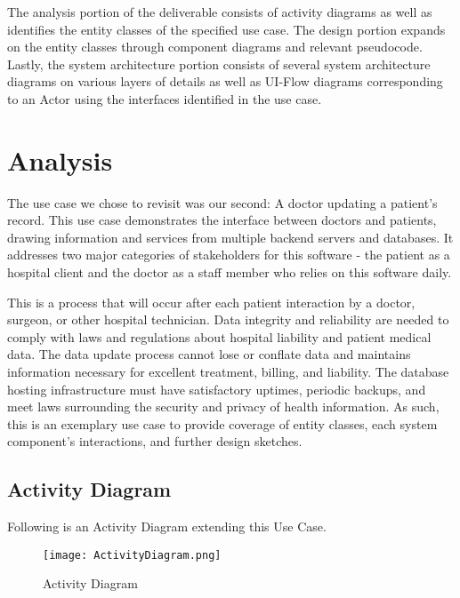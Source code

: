 \documentclass[a4paper, 11pt]{article}
\begin{document}
The analysis portion of the deliverable consists of activity diagrams as well as identifies the entity classes of the specified use case. The design portion expands on the entity classes through component diagrams and relevant pseudocode. Lastly, the system architecture portion consists of several system architecture diagrams on various layers of details as well as UI-Flow diagrams corresponding to an Actor using the interfaces identified in the use case.

\section{Analysis}

The use case we chose to revisit was our second: A doctor updating a patient's record. This use case demonstrates the interface between doctors and patients, drawing information and services from multiple backend servers and databases. It addresses two major categories of stakeholders for this software - the patient as a hospital client and the doctor as a staff member who relies on this software daily.

This is a process that will occur after each patient interaction by a doctor, surgeon, or other hospital technician. Data integrity and reliability are needed to comply with laws and regulations about hospital liability and patient medical data. The data update process cannot lose or conflate data and maintains information necessary for excellent treatment, billing, and liability. The database hosting infrastructure must have satisfactory uptimes, periodic backups, and meet laws surrounding the security and privacy of health information. As such, this is an exemplary use case to provide coverage of entity classes, each system component's interactions, and further design sketches. 

\subsection{Activity Diagram}

Following is an Activity Diagram extending this Use Case.

\begin{figure}[!htb]
    \centering
        \texttt{[image: ActivityDiagram.png]}
    \caption{Activity Diagram}\label{fig:activity_diagram}
\end{figure}
\end{document}
